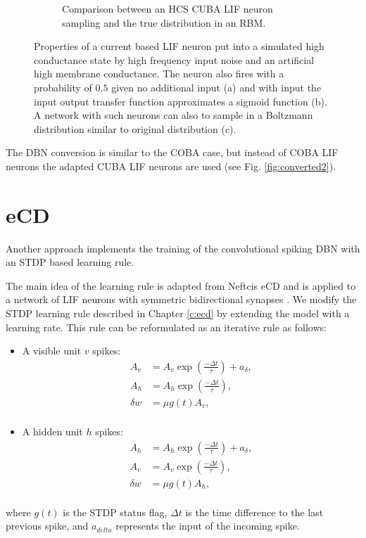 \begin{figure}
\begin{subfigure}[t]{.5\textwidth}
  		\caption{Comparison between an HCS CUBA LIF neuron sampling and the true distribution in an RBM.}
  		\label{fig:sub2}
	\end{subfigure}
	\caption[Properties of a current based LIF neuron in a high conductance state.]{Properties of a current based LIF neuron put into a simulated high conductance state by high frequency input noise and an artificial high membrane conductance. The neuron also fires with a probability of $0.5$ given no additional input (a) and with input the input output transfer function approximates a sigmoid function (b). A network with such neurons can also to sample in a Boltzmann distribution similar to original distribution (c).}
	\label{fig:cubahcs}
\end{figure}
The DBN conversion is similar to the COBA case, but instead of COBA LIF neurons the adapted CUBA LIF neurons are used (see Fig. \ref{fig:converted2}).

\section{eCD} \label{c:ecdappr}

Another approach implements the training of the convolutional spiking DBN with an STDP based learning rule. 

The main idea of the learning rule is adapted from Neftcis eCD and is applied to a network of LIF neurons with symmetric bidirectional synapses \cite{Neftci2013}.
We modify the STDP learning rule described in Chapter \ref{c:ecd} by extending the model with a learning rate. 
This rule can be reformulated as an iterative rule as follows:
\begin{itemize}
\item A visible unit $v$ spikes: 
\[
\begin{split}
A_v &= A_v \exp(\frac{-\Delta t}{\tau}) + a_{\delta} ,\\
A_h &= A_h \exp(\frac{-\Delta t}{\tau}) ,\\
\delta w &= \mu g(t)  A_v  ,\\
\end{split}
\]
\item A hidden unit $h$ spikes: 
\[
\begin{split}
A_h &= A_h \exp(\frac{-\Delta t}{\tau}) + a_{\delta} ,\\
A_v &= A_v \exp(\frac{-\Delta t}{\tau}) ,\\
\delta w &= \mu  g(t) A_h  ,\\
\end{split}
\]
\end{itemize}
where $g(t)$ is the STDP status flag, $\Delta t$ is the time difference to the last previous spike, and $a_{delta}$ represents the input of the incoming spike.


